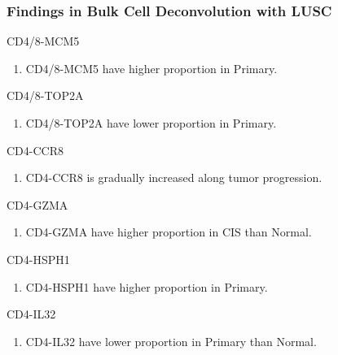 \documentclass{beamer}
\begin{document}
    \begin{frame}[allowframebreaks]
        \frametitle{Findings in Bulk Cell Deconvolution with LUSC}

        \begin{block}{CD4/8-MCM5}
            \begin{enumerate}
                \item CD4/8-MCM5 have higher proportion in Primary.
            \end{enumerate}
        \end{block}

        \begin{block}{CD4/8-TOP2A}
            \begin{enumerate}
                \item CD4/8-TOP2A have lower proportion in Primary.
            \end{enumerate}
        \end{block}

        \begin{block}{CD4-CCR8}
            \begin{enumerate}
                 \item CD4-CCR8 is gradually increased along tumor progression.
            \end{enumerate}
        \end{block}

        \begin{block}{CD4-GZMA}
            \begin{enumerate}
                \item CD4-GZMA have higher proportion in CIS than Normal.
            \end{enumerate}
        \end{block}

        \begin{block}{CD4-HSPH1}
            \begin{enumerate}
                \item CD4-HSPH1 have higher proportion in Primary.
            \end{enumerate}
        \end{block}

        \begin{block}{CD4-IL32}
            \begin{enumerate}
                \item CD4-IL32 have lower proportion in Primary than Normal.
            \end{enumerate}
        \end{block}


\end{frame}
\end{document}
